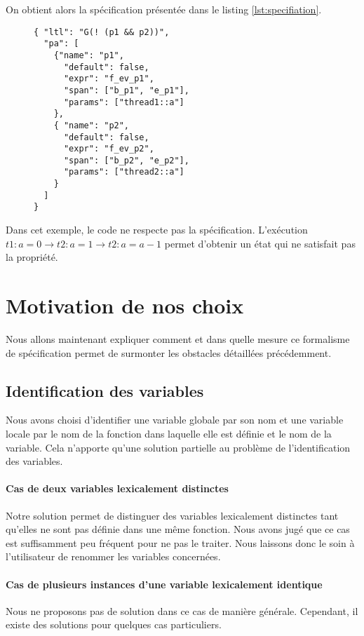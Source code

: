On obtient alors la spécification présentée dans le listing
\ref{lst:specifiation}.

\begin{figure}[h]
\begin{lstlisting}[frame=single, caption=Spécification, label=lst:specifiation]
{ "ltl": "G(! (p1 && p2))",
  "pa": [
    {"name": "p1",
      "default": false,
      "expr": "f_ev_p1",
      "span": ["b_p1", "e_p1"],
      "params": ["thread1::a"]
    },
    { "name": "p2",
      "default": false,
      "expr": "f_ev_p2",
      "span": ["b_p2", "e_p2"],
      "params": ["thread2::a"]
    }
  ]
}
\end{lstlisting}
\end{figure}

Dans cet exemple, le code ne respecte pas la spécification. L'exécution
\(t1: a = 0 \rightarrow t2: a = 1 \rightarrow t2: a = a - 1\) permet
d'obtenir un état qui ne satisfait pas la propriété.

\section{Motivation de nos choix}

Nous allons maintenant expliquer comment et dans quelle mesure ce formalisme
de spécification permet de surmonter les obstacles détaillées précédemment.

\subsection{Identification des variables}

Nous avons choisi d'identifier une variable globale par son nom et une
variable locale par le nom de la fonction dans laquelle elle est définie
et le nom de la variable. Cela n'apporte qu'une solution partielle au problème
de l'identification des variables.

\paragraph{Cas de deux variables lexicalement distinctes}
Notre solution permet de distinguer des variables lexicalement distinctes tant
qu'elles ne sont pas définie dans une même fonction. Nous avons jugé que ce cas
est suffisamment peu fréquent pour ne pas le traiter. Nous laissons donc le soin
à l'utilisateur de renommer les variables concernées.

\paragraph{Cas de plusieurs instances d'une variable lexicalement identique}
Nous ne proposons pas de solution dans ce cas de manière générale. Cependant,
il existe des solutions pour quelques cas particuliers.

